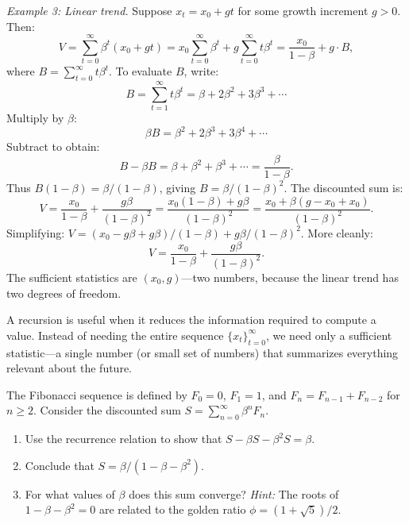 \medskip
\noindent\textit{Example 3: Linear trend.} Suppose $x_t = x_0 + gt$ for some growth increment $g > 0$. Then:
\begin{equation}
V = \sum_{t=0}^{\infty} \beta^t (x_0 + gt) = x_0 \sum_{t=0}^{\infty} \beta^t + g \sum_{t=0}^{\infty} t \beta^t = \frac{x_0}{1-\beta} + g \cdot B,
\end{equation}
where $B = \sum_{t=0}^{\infty} t \beta^t$. To evaluate $B$, write:
\begin{equation}
B = \sum_{t=1}^{\infty} t \beta^t = \beta + 2\beta^2 + 3\beta^3 + \cdots
\end{equation}
Multiply by $\beta$:
\begin{equation}
\beta B = \beta^2 + 2\beta^3 + 3\beta^4 + \cdots
\end{equation}
Subtract to obtain:
\begin{equation}
B - \beta B = \beta + \beta^2 + \beta^3 + \cdots = \frac{\beta}{1-\beta}.
\end{equation}
Thus $B(1-\beta) = \beta/(1-\beta)$, giving $B = \beta/(1-\beta)^2$. The discounted sum is:
\begin{equation}
V = \frac{x_0}{1-\beta} + \frac{g\beta}{(1-\beta)^2} = \frac{x_0(1-\beta) + g\beta}{(1-\beta)^2} = \frac{x_0 + \beta(g - x_0 + x_0)}{(1-\beta)^2}.
\end{equation}
Simplifying: $V = (x_0 - g\beta + g\beta)/(1-\beta) + g\beta/(1-\beta)^2$. More cleanly:
\begin{equation}
V = \frac{x_0}{1-\beta} + \frac{g\beta}{(1-\beta)^2}.
\end{equation}
The sufficient statistics are $(x_0, g)$---two numbers, because the linear trend has two degrees of freedom.

\begin{calloutnote}
A recursion is useful when it reduces the information required to compute a value. Instead of needing the entire sequence $\{x_t\}_{t=0}^{\infty}$, we need only a sufficient statistic---a single number (or small set of numbers) that summarizes everything relevant about the future.
\end{calloutnote}

\begin{callouttip}
The Fibonacci sequence is defined by $F_0 = 0$, $F_1 = 1$, and $F_n = F_{n-1} + F_{n-2}$ for $n \geq 2$. Consider the discounted sum $S = \sum_{n=0}^{\infty} \beta^n F_n$.
\begin{enumerate}[label=(\alph*), leftmargin=1.5em]
    \item Use the recurrence relation to show that $S - \beta S - \beta^2 S = \beta$.
    \item Conclude that $S = \beta / (1 - \beta - \beta^2)$.
    \item For what values of $\beta$ does this sum converge? \emph{Hint:} The roots of $1 - \beta - \beta^2 = 0$ are related to the golden ratio $\phi = (1 + \sqrt{5})/2$.
\end{enumerate}
\end{callouttip}

